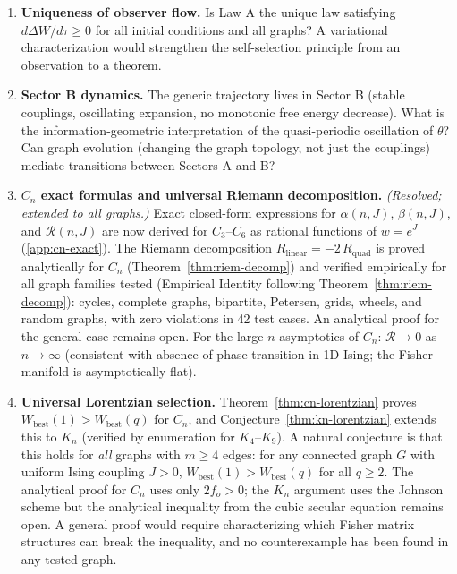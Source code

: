 \documentclass[11pt]{article}
\theoremstyle{definition}
\theoremstyle{remark}
\newcommand{\Riem}{R}
\newcommand{\Scal}{\mathcal{R}}
\newcommand{\expan}{\theta}
\begin{document}
\begin{enumerate}
\item \textbf{Uniqueness of observer flow.} Is Law A the unique
  law satisfying $d\Delta W/d\tau \geq 0$ for all initial conditions
  and all graphs? A variational characterization would strengthen
  the self-selection principle from an observation to a theorem.

\item \textbf{Sector B dynamics.} The generic trajectory lives in Sector B
  (stable couplings, oscillating expansion, no monotonic free energy decrease).
  What is the information-geometric interpretation of the quasi-periodic
  oscillation of $\expan$? Can graph evolution (changing the graph topology,
  not just the couplings) mediate transitions between Sectors A and B?

\item \textbf{$C_n$ exact formulas and universal Riemann decomposition.}
  \emph{(Resolved; extended to all graphs.)} Exact closed-form
  expressions for $\alpha(n, J)$, $\beta(n, J)$, and $\Scal(n, J)$ are
  now derived for $C_3$--$C_6$ as rational functions of $w = e^J$
  (\cref{app:cn-exact}). The Riemann decomposition
  $\Riem_{\mathrm{linear}} = -2\,\Riem_{\mathrm{quad}}$ is proved analytically
  for $C_n$ (Theorem~\ref{thm:riem-decomp}) and verified empirically
  for all graph families tested (Empirical Identity following Theorem~\ref{thm:riem-decomp}):
  cycles, complete graphs, bipartite, Petersen, grids, wheels, and random
  graphs, with zero violations in 42 test cases. An analytical proof for
  the general case remains open.
  For the large-$n$ asymptotics of $C_n$: $\Scal \to 0$ as $n \to \infty$
  (consistent with absence of phase transition in 1D Ising; the Fisher
  manifold is asymptotically flat).

\item \textbf{Universal Lorentzian selection.} Theorem~\ref{thm:cn-lorentzian}
  proves $W_{\mathrm{best}}(1) > W_{\mathrm{best}}(q)$
  for $C_n$, and Conjecture~\ref{thm:kn-lorentzian} extends this to $K_n$
  (verified by enumeration for $K_4$--$K_9$). A natural conjecture is
  that this holds for \emph{all} graphs with $m \geq 4$ edges: for any
  connected graph $G$ with uniform Ising coupling $J > 0$,
  $W_{\mathrm{best}}(1) > W_{\mathrm{best}}(q)$ for all $q \geq 2$.
  The analytical proof for $C_n$ uses only $2f_o > 0$; the $K_n$
  argument uses the Johnson scheme but the analytical inequality from
  the cubic secular equation remains open. A general proof would require
  characterizing which Fisher matrix structures can break the inequality,
  and no counterexample has been found in any tested graph.


\end{enumerate}
\end{document}

